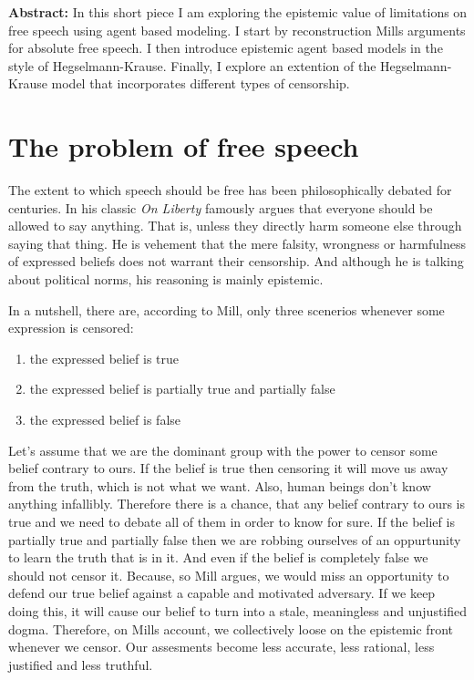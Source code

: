 \documentclass{essay-formal}
\begin{document}
\textbf{Abstract:} In this short piece I am exploring the epistemic value of limitations on free speech using agent based modeling. I start by reconstruction Mills arguments for absolute free speech. I then introduce epistemic agent based models in the style of Hegselmann-Krause. Finally, I explore an extention of the Hegselmann-Krause model that incorporates different types of censorship.

\section{The problem of free speech}

The extent to which speech should be free has been philosophically debated for centuries. In his classic \emph{On Liberty} \textcite{mill2011} famously argues that everyone should be allowed to say anything. That is, unless they directly harm someone else through saying that thing. He is vehement that the mere falsity, wrongness or harmfulness of expressed beliefs does not warrant their censorship. And although he is talking about political norms, his reasoning is mainly epistemic.

In a nutshell, there are, according to Mill, only three scenerios whenever some expression is censored:

\begin{enumerate}
	\item the expressed belief is true
	\item the expressed belief is partially true and partially false
	\item the expressed belief is false
\end{enumerate}

Let's assume that we are the dominant group with the power to censor some belief contrary to ours. If the belief is true then censoring it will move us away from the truth, which is not what we want. Also, human beings don't know anything infallibly. Therefore there is a chance, that any belief contrary to ours is true and we need to debate all of them in order to know for sure. If the belief is partially true and partially false then we are robbing ourselves of an oppurtunity to learn the truth that is in it. And even if the belief is completely false we should not censor it. Because, so Mill argues, we would miss an opportunity to defend our true belief against a capable and motivated adversary. If we keep doing this, it will cause our belief to turn into a stale, meaningless and unjustified dogma. Therefore, on Mills account, we collectively loose on the epistemic front whenever we censor. Our assesments become less accurate, less rational, less justified and less truthful.
\end{document}
